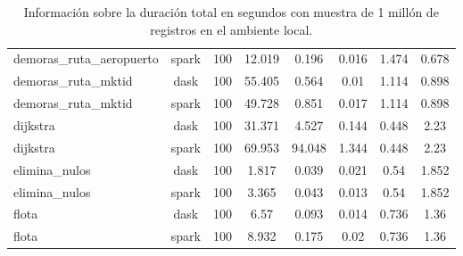 \begin{table}
{\begin{tabular}{|l|c c c c c c c|}
        demoras\_ruta\_aeropuerto & spark & 100 & 12.019 & 0.196 & 0.016 & 1.474 & 0.678 \\ %
        demoras\_ruta\_mktid & dask & 100 & 55.405 & 0.564 & 0.01 & 1.114 & 0.898 \\ %
        demoras\_ruta\_mktid & spark & 100 & 49.728 & 0.851 & 0.017 & 1.114 & 0.898 \\ %
        dijkstra & dask & 100 & 31.371 & 4.527 & 0.144 & 0.448 & 2.23 \\ %
        dijkstra & spark & 100 & 69.953 & 94.048 & 1.344 & 0.448 & 2.23 \\ %
        elimina\_nulos & dask & 100 & 1.817 & 0.039 & 0.021 & 0.54 & 1.852 \\ %
        elimina\_nulos & spark & 100 & 3.365 & 0.043 & 0.013 & 0.54 & 1.852 \\ %
        flota & dask & 100 & 6.57 & 0.093 & 0.014 & 0.736 & 1.36 \\ %
        flota & spark & 100 & 8.932 & 0.175 & 0.02 & 0.736 & 1.36 \\ \hline
    \end{tabular}}
    \caption{Información sobre la duración total en segundos con muestra de 1 millón de registros en el ambiente local.}
    \label{table:duracion1M}
\end{table}



